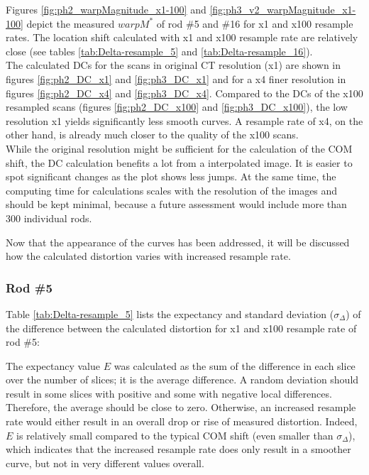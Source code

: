 Figures \ref{fig:ph2_warpMagnitude_x1-100} and \ref{fig:ph3_v2_warpMagnitude_x1-100} depict the measured $warpM^*$ of rod \#5 and \#16 for x1 and x100 resample rates.
The location shift calculated with x1 and x100 resample rate are relatively close (see tables \ref{tab:Delta-resample_5} and \ref{tab:Delta-resample_16}).\\

The calculated DCs for the scans in original CT resolution (x1) are shown in figures \ref{fig:ph2_DC_x1} and \ref{fig:ph3_DC_x1} and for a x4 finer resolution in figures \ref{fig:ph2_DC_x4} and \ref{fig:ph3_DC_x4}.
Compared to the DCs of the x100 resampled scans (figures \ref{fig:ph2_DC_x100} and \ref{fig:ph3_DC_x100}), the low resolution x1 yields significantly less smooth curves.
A resample rate of x4, on the other hand, is already much closer to the quality of the x100 scans.\\

While the original resolution might be sufficient for the calculation of the COM shift, the DC calculation benefits a lot from a interpolated image.
It is easier to spot significant changes as the plot shows less jumps.
At the same time, the computing time for calculations scales with the resolution of the images and should be kept minimal, because a future assessment would include more than 300 individual rods.

Now that the appearance of the curves has been addressed, it will be discussed how the calculated distortion varies with increased resample rate.

\subsubsection{Rod \#5}

Table \ref{tab:Delta-resample_5} lists the expectancy and standard deviation ($\sigma_\Delta$) of the difference between the calculated distortion for x1 and x100 resample rate of rod \#5:

The expectancy value $E$ was calculated as the sum of the difference in each slice over the number of slices; it is the average difference.
A random deviation should result in some slices with positive and some with negative local differences.
Therefore, the average should be close to zero.
Otherwise, an increased resample rate would either result in an overall drop or rise of measured distortion.
Indeed, $E$ is relatively small compared to the typical COM shift (even smaller than $\sigma_\Delta$), which indicates that the increased resample rate does only result in a smoother curve, but not in very different values overall.

